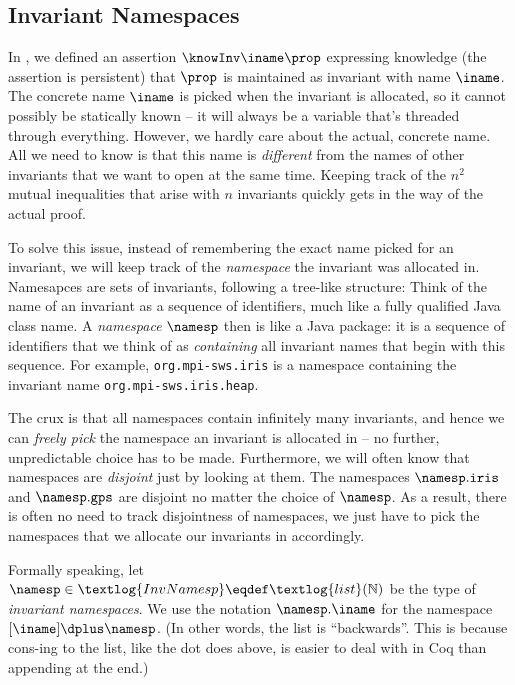 \subsection{Invariant Namespaces}
\label{sec:namespaces}

In , we defined an assertion $\knowInv\iname\prop$ expressing knowledge (\ie the assertion is persistent) that $\prop$ is maintained as invariant with name $\iname$.
The concrete name $\iname$ is picked when the invariant is allocated, so it cannot possibly be statically known -- it will always be a variable that's threaded through everything.
However, we hardly care about the actual, concrete name.
All we need to know is that this name is \emph{different} from the names of other invariants that we want to open at the same time.
Keeping track of the $n^2$ mutual inequalities that arise with $n$ invariants quickly gets in the way of the actual proof.

To solve this issue, instead of remembering the exact name picked for an invariant, we will keep track of the \emph{namespace} the invariant was allocated in.
Namesapces are sets of invariants, following a tree-like structure:
Think of the name of an invariant as a sequence of identifiers, much like a fully qualified Java class name.
A \emph{namespace} $\namesp$ then is like a Java package: it is a sequence of identifiers that we think of as \emph{containing} all invariant names that begin with this sequence. For example, \texttt{org.mpi-sws.iris} is a namespace containing the invariant name \texttt{org.mpi-sws.iris.heap}.

The crux is that all namespaces contain infinitely many invariants, and hence we can \emph{freely pick} the namespace an invariant is allocated in -- no further, unpredictable choice has to be made.
Furthermore, we will often know that namespaces are \emph{disjoint} just by looking at them.
The namespaces $\namesp.\texttt{iris}$ and $\namesp.\texttt{gps}$ are disjoint no matter the choice of $\namesp$.
As a result, there is often no need to track disjointness of namespaces, we just have to pick the namespaces that we allocate our invariants in accordingly.

Formally speaking, let $\namesp \in \textlog{InvNamesp} \eqdef \textlog{list}(\mathbb N)$ be the type of \emph{invariant namespaces}.
We use the notation $\namesp.\iname$ for the namespace $[\iname] \dplus \namesp$.
(In other words, the list is ``backwards''. This is because cons-ing to the list, like the dot does above, is easier to deal with in Coq than appending at the end.)

